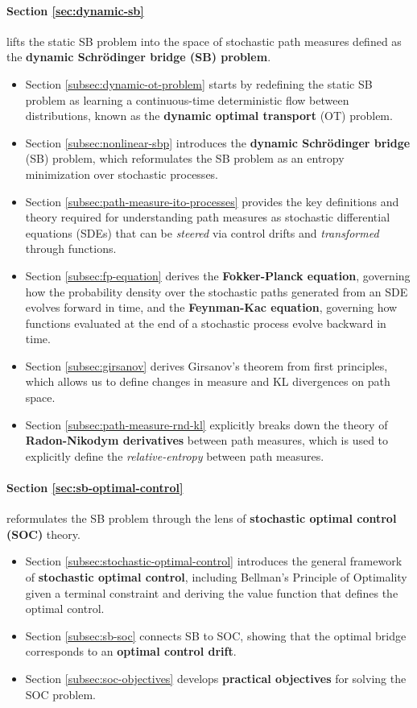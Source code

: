 \documentclass{article}
\begin{document}
\paragraph{Section \ref{sec:dynamic-sb}} lifts the static SB problem into the space of stochastic path measures defined as the \textbf{dynamic Schrödinger bridge (SB) problem}.
\begin{itemize}
    \item Section \ref{subsec:dynamic-ot-problem} starts by redefining the static SB problem as learning a continuous-time deterministic flow between distributions, known as the \textbf{dynamic optimal transport} (OT) problem. 
    \item Section \ref{subsec:nonlinear-sbp} introduces the \textbf{dynamic Schrödinger bridge} (SB) problem, which reformulates the SB problem as an entropy minimization over stochastic processes. 
    \item Section \ref{subsec:path-measure-ito-processes} provides the key definitions and theory required for understanding path measures as stochastic differential equations (SDEs) that can be \textit{steered} via control drifts and \textit{transformed} through functions. 
    \item Section \ref{subsec:fp-equation} derives the \textbf{Fokker-Planck equation}, governing how the probability density over the stochastic paths generated from an SDE evolves forward in time, and the \textbf{Feynman-Kac equation}, governing how functions evaluated at the end of a stochastic process evolve backward in time.
    \item Section \ref{subsec:girsanov} derives Girsanov's theorem from first principles, which allows us to define changes in measure and KL divergences on path space.
    \item Section \ref{subsec:path-measure-rnd-kl} explicitly breaks down the theory of \textbf{Radon-Nikodym derivatives} between path measures, which is used to explicitly define the \textit{relative-entropy} between path measures.
    \
\end{itemize}

\paragraph{Section \ref{sec:sb-optimal-control}} reformulates the SB problem through the lens of \textbf{stochastic optimal control (SOC)} theory.
\begin{itemize}
    \item Section \ref{subsec:stochastic-optimal-control} introduces the general framework of \textbf{stochastic optimal control}, including Bellman's Principle of Optimality given a terminal constraint and deriving the value function that defines the optimal control.
    \item Section \ref{subsec:sb-soc} connects SB to SOC, showing that the optimal bridge corresponds to an \textbf{optimal control drift}.
    \item Section \ref{subsec:soc-objectives} develops \textbf{practical objectives} for solving the SOC problem.
\end{itemize}
\end{document}
